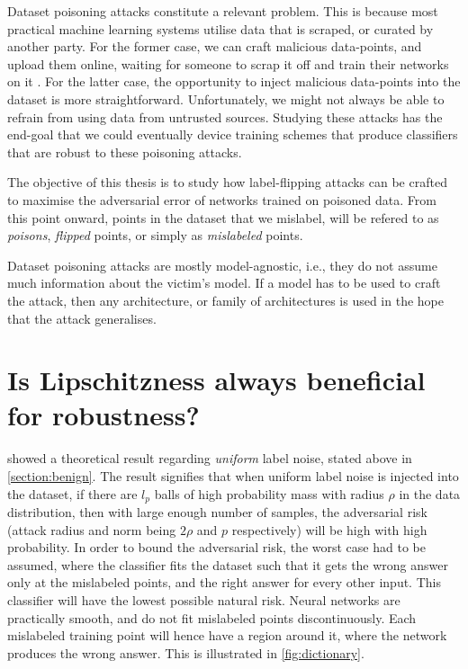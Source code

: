 \documentclass{ociamthesis}
\begin{document}
Dataset poisoning attacks constitute a relevant problem. This is because most
practical machine learning systems utilise data that is scraped, or curated by
another party. For the former case, we can craft malicious data-points, and
upload them online, waiting for someone to scrap it off and train their networks
on it \citep{transferable-clean-label-poisoning}. For the latter case, the
opportunity to inject malicious data-points into the dataset is more
straightforward. Unfortunately, we might not always be able to refrain from
using data from untrusted sources. Studying these attacks has the end-goal that
we could eventually device training schemes that produce classifiers that are
robust to these poisoning attacks.

The objective of this thesis is to study how label-flipping attacks can be
crafted to maximise the adversarial error of networks trained on poisoned data.
From this point onward, points in the dataset that we mislabel, will be refered
to as \emph{poisons}, \emph{flipped} points, or simply as \emph{mislabeled}
points.

Dataset poisoning attacks are mostly model-agnostic, i.e., they do not assume
much information about the victim's model. If a model has to be used to craft
the attack, then any architecture, or family of architectures is used in the
hope that the attack generalises.


\chapter{Is Lipschitzness always beneficial for robustness?}
\label{section:Lipschitzness-assumption}

\citet{sanyal2021how} showed a theoretical result regarding \emph{uniform} label
noise, stated above in \cref{section:benign}. The result signifies that when
uniform label noise is injected into the dataset, if there are $l_p$ balls of
high probability mass with radius $\rho$ in the data distribution, then with
large enough number of samples, the adversarial risk (attack radius and norm
being $2\rho$ and $p$ respectively) will be high with high probability. In order
to bound the adversarial risk, the worst case had to be assumed, where the
classifier fits the dataset such that it gets the wrong answer only at the
mislabeled points, and the right answer for every other input. This classifier
will have the lowest possible natural risk. Neural networks are practically
smooth, and do not fit mislabeled points discontinuously. Each mislabeled
training point will hence have a region around it, where the network produces
the wrong answer. This is illustrated in \cref{fig:dictionary}.
\end{document}
